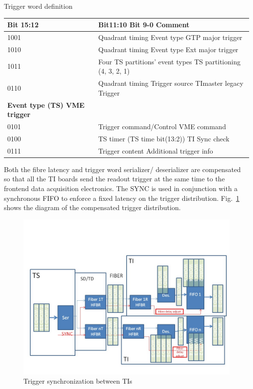 \begin{center}
	Trigger word definition\\
	\begin{tabular}{| l | l |}
		\hline \hline
		Bit 15:12		& 	Bit11:10	Bit 9-0	Comment		\\
		\hline
	1001	& Quadrant timing	Event type	GTP major trigger \\
	1010	& Quadrant timing	Event type	Ext major trigger \\
	1011	& Four TS partitions’ event types 	TS partitioning (4, 3, 2, 1) \\
	0110	& Quadrant timing	Trigger source 	TImaster legacy Trigger \\
		{\bf Event type	(TS) VME trigger} &     \\
	0101	& Trigger command/Control	VME command \\
	0100	& TS timer (TS time bit(13:2))	TI Sync check \\
	0111	& Trigger content	Additional trigger info \\
		\hline \hline
	\end{tabular}
\end{center}


Both the fibre latency and trigger word serializer/ deserializer are compensated so that all the TI boards send the readout trigger at the same time to the frontend data acquisition electronics.  The SYNC is used in conjunction with a synchronous FIFO to enforce a fixed latency on the trigger distribution. Fig.~\ref{fig:TIsync} shows the diagram of the compensated trigger distribution.

\begin{figure}[hbt]
	\centering
	\includegraphics[width=1.0\columnwidth,keepaspectratio]{img/TrgSync.jpg}
	\caption{Trigger synchronization between TIs}
	\label{fig:TIsync}
\end{figure}

